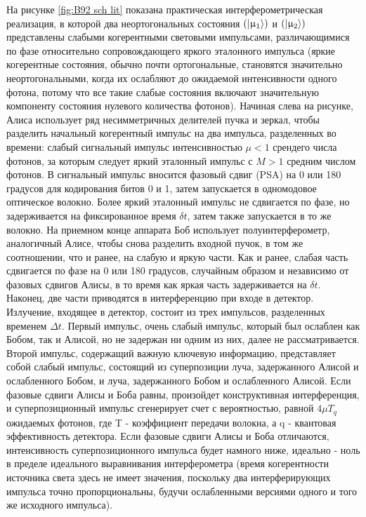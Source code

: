 На рисунке \ref{fig:B92 sch lit} показана практическая интерферометрическая реализация, в которой два неортогональных состояния $(\lvert\upmu_1\rangle)$ и $(\lvert\upmu_2\rangle)$ представлены слабыми когерентными световыми импульсами, различающимися по фазе относительно сопровождающего яркого эталонного импульса (яркие когерентные состояния, обычно почти ортогональные, становятся значительно неортогональными, когда их ослабляют до ожидаемой интенсивности одного фотона, потому что все такие слабые состояния включают значительную компоненту состояния нулевого количества фотонов). Начиная слева на рисунке, Алиса использует ряд несимметричных делителей пучка и зеркал, чтобы разделить начальный когерентный импульс на два импульса, разделенных во времени: слабый сигнальный импульс интенсивностью $\mu < 1$ срендего числа фотонов, за которым следует яркий эталонный импульс с $M > 1$ средним числом фотонов. В сигнальный импульс вносится фазовый сдвиг (PSA) на 0 или 180 градусов для кодирования битов 0 и 1, затем запускается в одномодовое оптическое волокно. Более яркий эталонный импульс не сдвигается по фазе, но задерживается на фиксированное время $\delta t$, затем также запускается в то же волокно. На приемном конце аппарата Боб использует полуинтерферометр, аналогичный Алисе, чтобы снова разделить входной пучок, в том же соотношении, что и ранее, на слабую и яркую части. Как и ранее, слабая часть сдвигается по фазе  на 0 или 180 градусов, случайным образом и независимо от фазовых сдвигов Алисы, в то время как яркая часть задерживается на $\delta t$. Наконец, две части приводятся в интерференцию при входе в детектор.
Излучение, входящее в детектор, состоит из трех импульсов, разделенных временем $\Delta t$. Первый импульс, очень слабый импульс, который был ослаблен как Бобом, так и Алисой, но не задержан ни одним из них, далее не рассматривается.
Второй импульс, содержащий важную ключевую информацию, представляет собой слабый импульс, состоящий из суперпозиции луча, задержанного Алисой и ослабленного Бобом, и луча, задержанного Бобом и ослабленного Алисой. Если фазовые сдвиги Алисы и Боба равны, произойдет конструктивная интерференция, и суперпозиционный импульс сгенерирует счет с вероятностью, равной $4\mu T_q$ ожидаемых фотонов, где T - коэффициент передачи волокна, а q - квантовая эффективность детектора. Если фазовые сдвиги Алисы и Боба отличаются, интенсивность суперпозиционного импульса будет намного ниже, идеально - ноль в пределе идеального выравнивания интерферометра (время когерентности источника света здесь не имеет значения, поскольку два интерферирующих импульса точно пропорциональны, будучи ослабленными версиями одного и того же исходного импульса).
